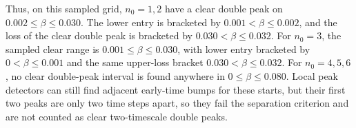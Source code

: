 \documentclass[superscriptaddress, amsmath, amssymb, aps, pre, floatfix]{revtex4-2}
\begin{document}
Thus, on this sampled grid, \(n_0=1,2\) have a clear double peak on \(0.002\leq\beta\leq0.030\).  The lower entry is bracketed by \(0.001<\beta\leq0.002\), and the loss of the clear double peak is bracketed by \(0.030<\beta\leq0.032\).  For \(n_0=3\), the sampled clear range is \(0.001\leq\beta\leq0.030\), with lower entry bracketed by \(0<\beta\leq0.001\) and the same upper-loss bracket \(0.030<\beta\leq0.032\).  For \(n_0=4,5,6\), no clear double-peak interval is found anywhere in \(0\leq\beta\leq0.080\).  Local peak detectors can still find adjacent early-time bumps for these starts, but their first two peaks are only two time steps apart, so they fail the separation criterion and are not counted as clear two-timescale double peaks.
\end{document}
